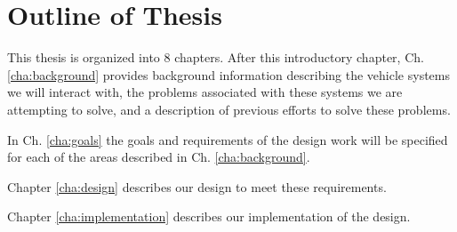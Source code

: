 \section{Outline of Thesis}

This thesis is organized into 8 chapters. After this introductory chapter, Ch. \ref{cha:background} provides background information describing the vehicle systems we will interact with, the problems associated with these systems we are attempting to solve, and a description of previous efforts to solve these problems. 

In Ch. \ref{cha:goals} the goals and requirements of the design work will be specified for each of the areas described in Ch. \ref{cha:background}. 

Chapter \ref{cha:design} describes our design to meet these requirements. 

Chapter \ref{cha:implementation} describes our implementation of the design.
